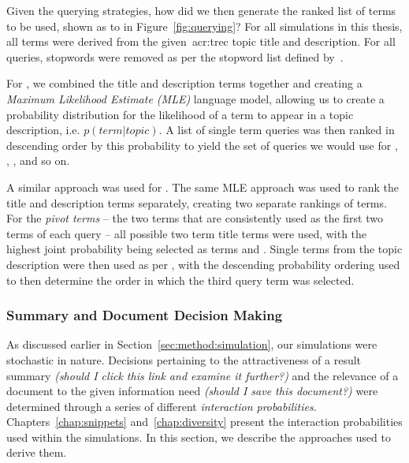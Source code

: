 Given the querying strategies, how did we then generate the ranked list of terms to be used, shown as  to  in Figure~\ref{fig:querying}? For all simulations in this thesis, all terms were derived from the given~\gls{acr:trec} topic title and description. For all queries, stopwords were removed as per the stopword list defined by~\cite{fox1992stopwords}.

For , we combined the title and description terms together and creating a \emph{Maximum Likelihood Estimate (MLE)} language model, allowing us to create a probability distribution for the likelihood of a term to appear in a topic description, i.e. $p(term|topic)$. A list of single term queries was then ranked in descending order by this probability to yield the set of queries we would use for , , , and so on.

A similar approach was used for . The same MLE approach was used to rank the title and description terms separately, creating two separate rankings of terms. For the \emph{pivot terms} -- the two terms that are consistently used as the first two terms of each  query -- all possible two term title terms were used, with the highest joint probability being selected as terms  and . Single terms from the topic description were then used as per , with the descending probability ordering used to then determine the order in which the third query term was selected.

\subsubsection{Summary and Document Decision Making}\label{sec:method:simulation:grounding:judgements}
As discussed earlier in Section~\ref{sec:method:simulation}, our simulations were stochastic in nature. Decisions pertaining to the attractiveness of a result summary \emph{(should I click this link and examine it further?)} and the relevance of a document to the given information need \emph{(should I save this document?)} were determined through a series of different \emph{interaction probabilities.} Chapters~\ref{chap:snippets} and~\ref{chap:diversity} present the interaction probabilities used within the simulations. In this section, we describe the approaches used to derive them.


